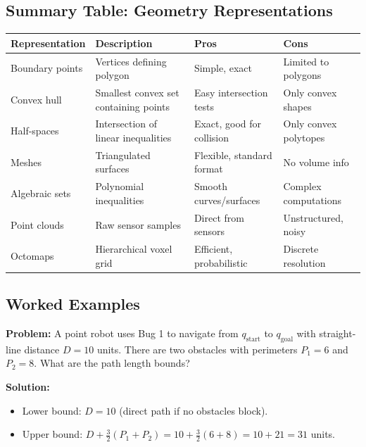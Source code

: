 \bigseparator

\subsection{Summary Table: Geometry Representations}

\begin{center}
\renewcommand{\arraystretch}{1.3}
\begin{tabular}{@{} l p{4cm} p{4cm} p{3cm} @{}}
\toprule
\textbf{Representation} & \textbf{Description} & \textbf{Pros} & \textbf{Cons} \\
\midrule
Boundary points & Vertices defining polygon & Simple, exact & Limited to polygons \\
Convex hull & Smallest convex set containing points & Easy intersection tests & Only convex shapes \\
Half-spaces & Intersection of linear inequalities & Exact, good for collision & Only convex polytopes \\
Meshes & Triangulated surfaces & Flexible, standard format & No volume info \\
Algebraic sets & Polynomial inequalities & Smooth curves/surfaces & Complex computations \\
Point clouds & Raw sensor samples & Direct from sensors & Unstructured, noisy \\
Octomaps & Hierarchical voxel grid & Efficient, probabilistic & Discrete resolution \\
\bottomrule
\end{tabular}
\end{center}

\bigseparator

\subsection{Worked Examples}

\begin{exbox}
\textbf{Problem:} A point robot uses Bug 1 to navigate from $q_{\text{start}}$ to $q_{\text{goal}}$ with straight-line distance $D = 10$ units. There are two obstacles with perimeters $P_1 = 6$ and $P_2 = 8$. What are the path length bounds?

\textbf{Solution:}
\begin{itemize}
  \item Lower bound: $D = 10$ (direct path if no obstacles block).
  \item Upper bound: $D + \frac{3}{2}(P_1 + P_2) = 10 + \frac{3}{2}(6 + 8) = 10 + 21 = 31$ units.
\end{itemize}
\end{exbox}

